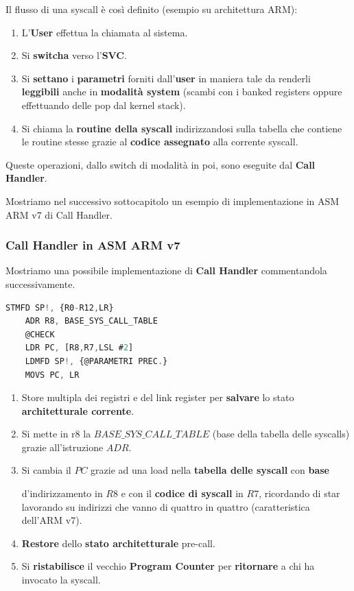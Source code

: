 \documentclass{article}
\begin{document}
Il flusso di una syscall è così definito (esempio su architettura ARM):

\vspace*{5px}

\begin{enumerate}
    \item L'\textbf{User} effettua la chiamata al sistema.
    \item Si \textbf{switcha} verso l'\textbf{SVC}.
    \item Si \textbf{settano} i \textbf{parametri} forniti dall'\textbf{user} in maniera tale da renderli \textbf{leggibili} anche in \textbf{modalità system} (scambi con i banked registers oppure effettuando delle pop dal kernel stack).
    \item Si chiama la \textbf{routine della syscall} indirizzandosi sulla tabella che contiene le routine stesse grazie al \textbf{codice assegnato} alla corrente syscall.
\end{enumerate}

Queste operazioni, dallo switch di modalità in poi, sono eseguite dal \textbf{Call Handler}.

\vspace*{10px}

Mostriamo nel successivo sottocapitolo un esempio di implementazione in ASM ARM v7 di Call Handler.

\newpage

\subsubsection{Call Handler in ASM ARM v7}

Mostriamo una possibile implementazione di \textbf{Call Handler} commentandola successivamente.

\vspace*{5px}


\begin{lstlisting}[language = JavaScript]
    STMFD SP!, {R0-R12,LR}
    ADR R8, BASE_SYS_CALL_TABLE
    @CHECK
    LDR PC, [R8,R7,LSL #2]
    LDMFD SP!, {@PARAMETRI PREC.}
    MOVS PC, LR
\end{lstlisting}

\begin{enumerate}
    \item Store multipla dei registri e del link register per \textbf{salvare} lo stato \textbf{architetturale corrente}.
    \item Si mette in r8 la $BASE\_SYS\_CALL\_TABLE$ (base della tabella delle syscalls) grazie all'istruzione $ADR$.
    \item Si cambia il $PC$ grazie ad una load nella \textbf{tabella delle syscall} con \textbf{base} 
    
    d'indirizzamento in $R8$ e con il \textbf{codice di syscall} in $R7$, ricordando di star lavorando su indirizzi che vanno di quattro in quattro (caratteristica dell'ARM v7).
    \item \textbf{Restore} dello \textbf{stato architetturale} pre-call.
    \item Si \textbf{ristabilisce} il vecchio \textbf{Program Counter} per \textbf{ritornare} a chi ha invocato la syscall.
\end{enumerate}
\end{document}
